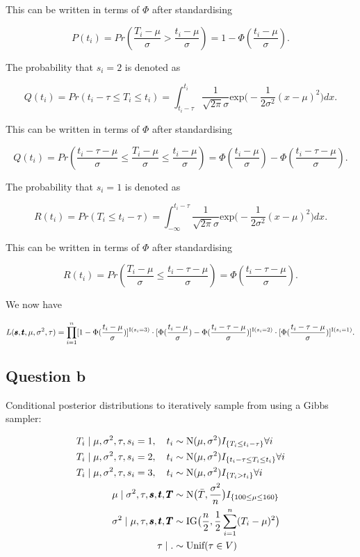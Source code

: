 \documentclass[
  12pt,
]{article}
\renewcommand{\boldsymbol}[1]{\text{\pmb{$#1$}}}
\begin{document}
This can be written in terms of \(\Phi\) after standardising

\[
P(t_i) = Pr(\frac{T_i-\mu}{\sigma} > \frac{t_i-\mu}{\sigma}) = 1 - \Phi(\frac{t_i-\mu}{\sigma}).
\]

The probability that \(s_i=2\) is denoted as

\[
Q(t_i) = Pr(t_i - \tau \leq T_i \leq t_i) = \int^{t_i}_{t_i - \tau} \frac{1}{\sqrt{2 \pi} \sigma} \text{exp} \big( -\frac{1}{2\sigma^2} (x - \mu)^2\big) dx.
\]

This can be written in terms of \(\Phi\) after standardising

\[
Q(t_i) = Pr(\frac{t_i - \tau - \mu}{\sigma} \leq\frac{T_i-\mu}{\sigma} \leq \frac{t_i-\mu}{\sigma}) = \Phi(\frac{t_i-\mu}{\sigma}) - \Phi(\frac{t_i -\tau - \mu}{\sigma}).
\]

The probability that \(s_i=1\) is denoted as

\[
R(t_i) = Pr(T_i \leq t_i - \tau) = \int^{t_i - \tau}_{- \infty} \frac{1}{\sqrt{2 \pi} \sigma} \text{exp} \big( -\frac{1}{2\sigma^2} (x - \mu)^2\big) dx.
\]

This can be written in terms of \(\Phi\) after standardising

\[
R(t_i) = Pr(\frac{T_i-\mu}{\sigma} \leq \frac{t_i-\tau-\mu}{\sigma}) = \Phi(\frac{t_i-\tau-\mu}{\sigma}).
\]

We now have

\[
L(\boldsymbol{s}, \boldsymbol{t}, \mu, \sigma^2, \tau) = \prod^{n}_{i=1} [1 - \Phi(\frac{t_i-\mu}{\sigma})]^{\text{I}(s_i=3)} \cdot [\Phi(\frac{t_i-\mu}{\sigma}) - \Phi(\frac{t_i -\tau - \mu}{\sigma})]^{\text{I}(s_i=2)} \cdot [\Phi(\frac{t_i-\tau-\mu}{\sigma})]^{\text{I}(s_i=1)}.
\]

\subsection{Question b}\label{question-b}

Conditional posterior distributions to iteratively sample from using a
Gibbs sampler:

\[
\begin{aligned}
T_i \mid \mu,\sigma^2,\tau,s_i =1, \quad t_i & \sim \text{N}(\mu, \sigma^2) I_{\{T_i \leq t_i - \tau \}} \forall i \\
T_i \mid \mu,\sigma^2,\tau,s_i =2, \quad t_i & \sim \text{N}(\mu, \sigma^2) I_{\{t_i-\tau \leq T_i \leq t_i \}} \forall i \\
T_i \mid \mu,\sigma^2,\tau,s_i =3, \quad t_i & \sim \text{N}(\mu, \sigma^2) I_{\{T_i > t_i \}} \forall i \\
\mu \mid \sigma^2,\tau, \boldsymbol{s} , \boldsymbol{t} , \boldsymbol{T} & \sim \text{N} \big(\bar{T}, \frac{\sigma^2}{n} \big) I_{\{100 \leq \mu \leq 160 \}} \\
\sigma^2 \mid \mu, \tau, \boldsymbol{s}, \boldsymbol{t}, \boldsymbol{T} & \sim \text{IG} \big( \frac{n}{2}, \frac{1}{2} \sum^n_{i=1} (T_i - \mu)^2 \big) \\
\tau \mid . & \sim \text{Unif}(\tau \in V)
\end{aligned}
\]
\end{document}
